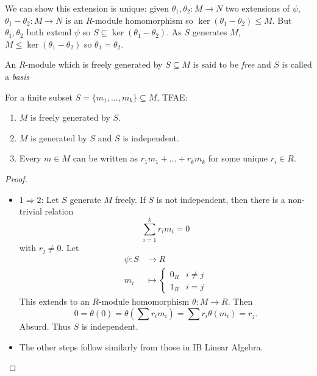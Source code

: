 \documentclass[a4paper]{article}
\theoremstyle{definition}
\begin{document}
\begin{note}
  We can show this extension is unique: given \(\theta_1, \theta_2: M \to N\) two extensions of \(\psi\), \(\theta_1 - \theta_2:M \to N\) is an \(R\)-module homomorphism so \(\ker(\theta_1 - \theta_2) \leq M\). But \(\theta_1, \theta_2\) both extend \(\psi\) so \(S \subseteq \ker(\theta_1 - \theta_2)\). As \(S\) generates \(M\), \(M \leq \ker(\theta_1 - \theta_2)\) so \(\theta_1 = \theta_2\).
\end{note}

An \(R\)-module which is freely generated by \(S \subseteq M\) is said to be \emph{free} and \(S\) is called a \emph{basis}

\begin{proposition}
  For a finite subset \(S = \{m_1, \dots, m_k\} \subseteq M\), TFAE:
  \begin{enumerate}
  \item \(M\) is freely generated by \(S\).
  \item \(M\) is generated by \(S\) and \(S\) is independent.
  \item Every \(m \in M\) can be written as \(r_1m_1 + \dots + r_km_k\) for some unique \(r_i \in R\).
  \end{enumerate}
\end{proposition}

\begin{proof}\leavevmode
  \begin{itemize}
  \item \(1 \Rightarrow 2\): Let \(S\) generate \(M\) freely. If \(S\) is not independent, then there is a non-trivial relation
    \[
      \sum_{i = 1}^k r_im_i = 0
    \]
    with \(r_j \neq 0\). Let
    \begin{align*}
      \psi: S &\to R \\
      m_i &\mapsto
            \begin{cases}
              0_R & i \neq j \\
              1_R & i = j
            \end{cases}
    \end{align*}
    This extends to an \(R\)-module homomorphism \(\theta: M \to R\). Then
    \[
      0 = \theta(0) = \theta \left(\sum r_im_i \right) = \sum r_i\theta(m_i) = r_j.
    \]
    Absurd. Thus \(S\) is independent.
  \item The other steps follow similarly from those in IB Linear Algebra.
  \end{itemize}
\end{proof}
\end{document}

